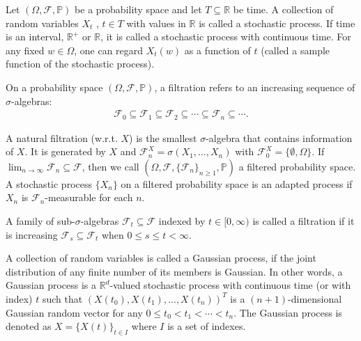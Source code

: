 	\begin{definition}
		Let $(\Omega, \mathcal{F}, \mathbb{P})$ be a probability space and let $T \subseteq \mathbb{R}$ be
		time. A collection of random variables $X_t$ , $t \in T$ with values in $\mathbb{R}$ is called a
		stochastic process. If time is an interval, $\mathbb{R}^+$ or $\mathbb{R}$, it is called a stochastic process with continuous time. For any fixed $w \in \Omega$, one can regard $X_t (w)$ as a function of
		$t$ (called a sample function of the stochastic process).
	\end{definition}

	\noindent On a probability space $(\Omega, \mathcal{F}, \mathbb{P})$, a filtration refers to an increasing sequence of $\sigma$-algebras:
	\begin{align*}
		\mathcal{F}_0 \subseteq \mathcal{F}_1 \subseteq \mathcal{F}_2 \subseteq \cdots \subseteq \mathcal{F}_n \subseteq \cdots .
	\end{align*}
	
	\noindent A natural filtration (w.r.t. $X$) is the smallest $\sigma$-algebra that contains
	information of $X$. It is generated by $X$ and $\mathcal{F}^X_n = \sigma(X_1, \dots, X_n)$ with $\mathcal{F}^X_0 = \{\emptyset, \Omega \}$. If $\lim_{n \rightarrow \infty} \mathcal{F}_n \subseteq \mathcal{F}$, then we call $(\Omega, \mathcal{F}, \{ \mathcal{F}_n \}_{n \geq 1}, \mathbb{P})$ a filtered probability space. A stochastic process $\{X_n \}$ on a filtered probability space is an adapted process if $X_n$ is $\mathcal{F}_n$-measurable for each $n$.
	
	\begin{definition}
		A family of sub-$\sigma$-algebras $\mathcal{F}_t \subseteq \mathcal{F}$ indexed by $t \in [0, \infty)$ is called a filtration if it is increasing $\mathcal{F}_s \subseteq \mathcal{F}_t$ when $0 \leq s \leq t < \infty$.
	\end{definition}
	
	\begin{definition} 
		A collection of random variables is called a Gaussian process, if the joint distribution of any finite number of its members is Gaussian. In other words, a Gaussian process is a $\mathbb{R}^d$-valued stochastic process with continuous time (or with index) $t$ such that $\left(X(t_0), X(t_1), \dots, X(t_n) \right)^T$ is a $(n+1)$-dimensional Gaussian random vector
		for any $0 \leq t_0 < t_1 < \cdots < t_n$. The Gaussian process is denoted as $X = \{X(t)\}_{t \in I}$ where $I$ is a set of indexes.
	\end{definition}
	
